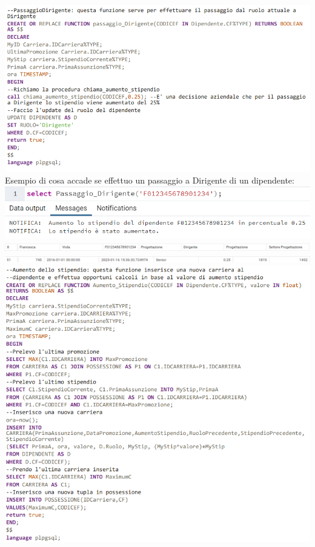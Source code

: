 \includegraphics[width=1\textwidth]{Immagini/passaggioDir.sql}
\newpage
Esempio di cosa accade se effettuo un passaggio a Dirigente di un dipendente:
\newline\newline
\includegraphics[width=1\textwidth]{Immagini/passaggioDir}
\includegraphics[width=1.2\textwidth]{Immagini/viola}
\includegraphics[width=1.2\textwidth]{Immagini/carriera}
\newline\newline
\includegraphics[width=1\textwidth]{Immagini/aumento_stip.sql}

